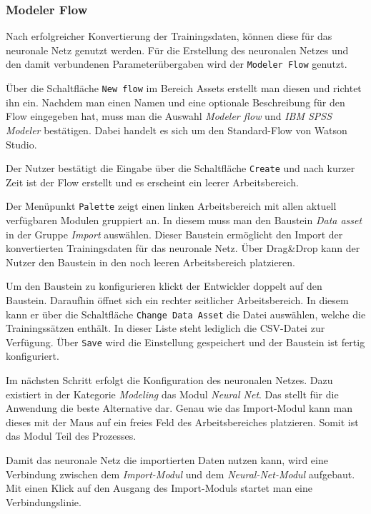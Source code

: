 
\subsubsection{Modeler Flow}
\label{subsub:modeler_flow}
Nach erfolgreicher Konvertierung der Trainingsdaten, können diese für das neuronale Netz genutzt werden. Für die
Erstellung des neuronalen Netzes und den damit verbundenen Parameterübergaben wird der \texttt{Modeler Flow} genutzt.

Über die Schaltfläche \texttt{New flow} im Bereich Assets erstellt man diesen und richtet ihn ein. Nachdem man einen Namen
und eine optionale Beschreibung für den Flow eingegeben hat, muss man die Auswahl \textit{Modeler flow} und
\textit{IBM SPSS Modeler} bestätigen. Dabei handelt es sich um den Standard-Flow von Watson Studio.

Der Nutzer bestätigt die Eingabe über die Schaltfläche \texttt{Create} und nach kurzer Zeit ist der Flow erstellt und es
erscheint ein leerer Arbeitsbereich.

Der Menüpunkt \texttt{Palette} zeigt einen linken Arbeitsbereich mit allen aktuell verfügbaren Modulen gruppiert an. In
diesem muss man den Baustein \textit{Data asset} in der Gruppe \textit{Import} auswählen. Dieser Baustein ermöglicht den
Import der konvertierten Trainingsdaten für das neuronale Netz. Über Drag\&Drop kann der Nutzer den Baustein in den noch
leeren Arbeitsbereich platzieren.

Um den Baustein zu konfigurieren klickt der Entwickler doppelt auf den Baustein. Daraufhin öffnet sich ein rechter
seitlicher Arbeitsbereich. In diesem kann er über die Schaltfläche \texttt{Change Data Asset} die Datei auswählen, welche
die Trainingssätzen enthält. In dieser Liste steht lediglich die CSV-Datei zur Verfügung. Über \texttt{Save} wird die
Einstellung gespeichert und der Baustein ist fertig konfiguriert.

Im nächsten Schritt erfolgt die Konfiguration des neuronalen Netzes. Dazu existiert in der Kategorie \textit{Modeling} das
Modul \textit{Neural Net}. Das stellt für die Anwendung die beste Alternative dar. Genau wie das Import-Modul kann
man dieses mit der Maus auf ein freies Feld des Arbeitsbereiches platzieren. Somit ist das Modul Teil des Prozesses.

Damit das neuronale Netz die importierten Daten nutzen kann, wird eine Verbindung zwischen dem \textit{Import-Modul} und
dem \textit{Neural-Net-Modul} aufgebaut. Mit einen Klick auf den Ausgang des Import-Moduls startet man eine
Verbindungslinie.

